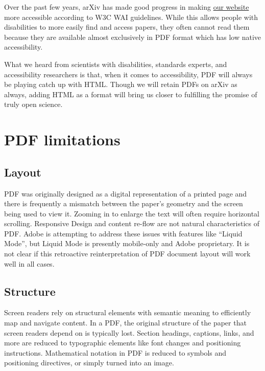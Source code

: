 \documentclass{easychair}
\begin{document}
Over the past few years, arXiv has made good progress in making \href{https://arxiv.org}{our website} more accessible according to W3C WAI guidelines. While this allows people with disabilities to more easily find and access papers, they often cannot read them because they are available almost exclusively in PDF format which has low native accessibility. 

What we heard from scientists with disabilities, standards experts, and accessibility researchers is that, when it comes to accessibility, PDF will always be playing catch up with HTML. Though we will retain PDFs on arXiv as always, adding HTML as a format will bring us closer to fulfilling the promise of truly open science.

\section{PDF limitations}
\label{sect:PDF limitations}

\subsection{Layout}
\label{sect:Layout}

PDF was originally designed as a digital representation of a printed page and there is frequently a mismatch between the paper’s geometry and the screen being used to view it. Zooming in to enlarge the text will often require horizontal scrolling. Responsive Design and content re-flow are not natural characteristics of PDF. Adobe is attempting to address these issues with features like “Liquid Mode”, but Liquid Mode is presently mobile-only and Adobe proprietary. It is not clear if this retroactive reinterpretation of PDF document layout will work well in all cases.

\subsection{Structure}
\label{sect:Structure}

Screen readers rely on structural elements with semantic meaning to efficiently map and navigate content. In a PDF, the original structure of the paper that screen readers depend on is typically lost. Section headings, captions, links, and more are reduced to typographic elements like font changes and positioning instructions. Mathematical notation in PDF is reduced to symbols and positioning directives, or simply turned into an image.
\end{document}
